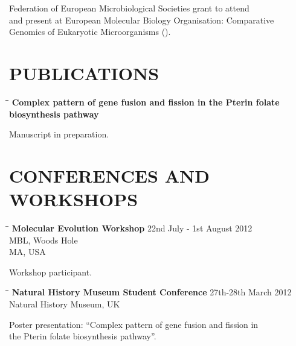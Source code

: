 \documentclass{res}
\begin{document}
\begin{resume}
    Federation of European Microbiological Societies grant to attend\\ and present at European Molecular Biology Organisation: Comparative \\Genomics of Eukaryotic Microorganisms ().

\newpage
\section{PUBLICATIONS} 
    \vspace{-0.05in}
\begin{tabbing}
   \hspace{2.3in}\= \hspace{2.6in}\= \kill
   {\bf Complex pattern of gene fusion and fission in the Pterin folate biosynthesis pathway}
   \end{tabbing}\vspace{-20pt}
Manuscript in preparation.

\section{CONFERENCES AND WORKSHOPS}
  \vspace{-0.05in}
  
\begin{tabbing}
\hspace{2in}\= \hspace{2.6in}\= \kill
{\bf Molecular Evolution Workshop} \> \> 22nd July - 1st August 2012\\
\> \> MBL, Woods Hole \\
\> \> MA, USA \\
\end{tabbing}\vspace{-55pt}
Workshop participant.


 \begin{tabbing}
   \hspace{2in}\= \hspace{2.6in}\= \kill 
    {\bf Natural History Museum Student Conference } \>  \> 27th-28th March 2012\\
                        \>     \> Natural History Museum, UK
   \end{tabbing}\vspace{-30pt}      
   
 Poster presentation: ``Complex pattern of gene fusion and fission in \\ the Pterin folate biosynthesis pathway''.
  

\end{resume}
\end{document}

